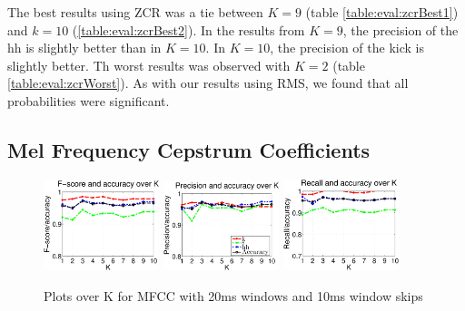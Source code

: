 		The best results using ZCR was a tie between $K=9$ (table \ref{table:eval:zcrBest1}) and $k=10$ (\ref{table:eval:zcrBest2}). In the results from $K=9$, the precision of the hh is slightly better than in $K=10$. In $K=10$, the precision of the kick is slightly better.
		Th worst results was observed with $K=2$ (table \ref{table:eval:zcrWorst}). As with our results using RMS, we found that all probabilities were significant.
		
		
	\subsection{Mel Frequency Cepstrum Coefficients}
		\begin{figure}
			\centering\includegraphics[width=0.3\textwidth]{tex/appendices/test/mfcc2010FP.png}
			\centering\includegraphics[width=0.3\textwidth]{tex/appendices/test/mfcc2010_P.png}
			\centering\includegraphics[width=0.3\textwidth]{tex/appendices/test/mfcc2010_R.png}
			
			\caption{Plots over K for MFCC with 20ms windows and 10ms window skips}
		\end{figure}
